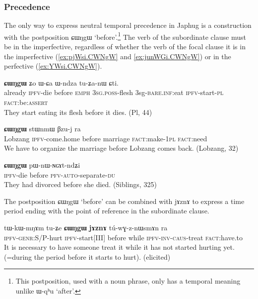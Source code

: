 \documentclass[oldfontcommands,oneside,a4paper,11pt]{article}
\newcommand{\ipa}[1]{{\phon \mbox{#1}}} %
\newcommand{\refb}[1]{(\ref{#1})}
\begin{document}
\subsubsection{Precedence} \label{sec:precedence}
The only way to express neutral temporal precedence  in Japhug  is a construction with the postposition  \ipa{ɕɯŋgɯ} `before'.\footnote{This postposition, used with a noun phrase, only has a temporal meaning unlike \ipa{ɯ-qʰu} `after'.} The verb of the subordinate clause must be in the imperfective, regardless of whether the verb of the focal clause it is in the imperfective  (\ref{ex:pjWsi.CWNgW} and \ref{ex:junWGi.CWNgW}) or in the perfective   \refb{ex:YWsi.CWNgW}.

\begin{exe}
\ex \label{ex:pjWsi.CWNgW}
\gll [\ipa{pɤjkʰu}  	\ipa{pjɯ-si}]  	\textbf{\ipa{ɕɯŋgɯ}}  	\ipa{ʑo}  	\ipa{ɯ-ɕa}  	\ipa{ɯ-ndza}  	\ipa{tu-ʑa-nɯ}  	\ipa{ɕti.}  \\
already \textsc{ipfv}-die before \textsc{emph} \textsc{3sg.poss}-flesh 3sg-\textsc{bare.inf}:eat \textsc{ipfv}-start-\textsc{pl} \textsc{fact}:be:\textsc{assert} \\
\glt They start eating its flesh before it dies. (Pl, 44)
\end{exe}

\begin{exe}
\ex \label{ex:junWGi.CWNgW}
\gll
[\ipa{lɤβzaŋ}  	\ipa{ju-nɯɣi}]  	\textbf{\ipa{ɕɯŋgɯ}}  	\ipa{stɯnmɯ}  	\ipa{βzu-j}  	\ipa{ra}  \\
Lobzang \textsc{ipfv}-come.home before marriage \textsc{fact}:make-\textsc{1pl} \textsc{fact}:need \\
\glt We have to organize the marriage before Lobzang comes back. (Lobzang, 32)
\end{exe}

\begin{exe}
\ex \label{ex:YWsi.CWNgW}
\gll
[\ipa{ɲɯ-si}]  	\textbf{\ipa{ɕɯŋgɯ}}  	\ipa{pɯ-nɯ-ɴɢɤt-ndʑi}  \\
\textsc{ipfv}-die before \textsc{pfv-auto}-separate-\textsc{du} \\
\glt They had divorced before she died. (Siblings, 325)
\end{exe}

The postposition \ipa{ɕɯŋgɯ} `before' can be combined with  \ipa{jɤznɤ} to express a time period ending with the point of reference in the subordinate clause.

\begin{exe}
\ex \label{ex:CWNgW.jAZnA}
\gll
\ipa{tɯ-kɯ-mŋɤm}  	\ipa{tu-ʑe}  	\ipa{\textbf{ɕɯŋgɯ}}  	\ipa{\textbf{jɤznɤ}}  	\ipa{tú-wɣ-z-nɯsmɤn}  	\ipa{ra}  \\
\textsc{ipfv-genr}:S/P-hurt \textsc{ipfv}-start[III] before while \textsc{ipfv-inv-caus}-treat \textsc{fact}:have.to \\
\glt It is necessary to have someone treat it while it has not started hurting yet. (=during the period before it starts to hurt). (elicited)
\end{exe}
 
\end{document}
